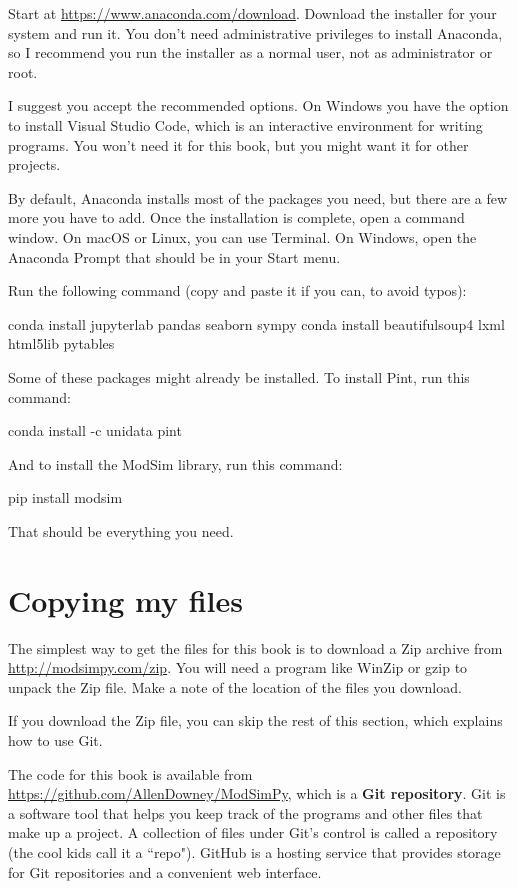 \documentclass[12pt]{book}
\theoremstyle{exercise}
\begin{document}
Start at \url{https://www.anaconda.com/download}.  Download the installer for your system and run it.  You don't need administrative privileges to install Anaconda, so I recommend you run the installer as a normal user, not as administrator or root.

I suggest you accept the recommended options.
On Windows you have the option to install Visual Studio Code, which is an interactive environment for writing programs.  You won't need it for this book, but you might want it for other projects.

By default, Anaconda installs most of the packages you need, but there are a few more you have to add.  Once the installation is complete, open a command window.  On macOS or Linux, you can use Terminal.  On Windows, open the Anaconda Prompt that should be in your Start menu.

Run the following command (copy and paste it if you can, to avoid typos):

\begin{code}
conda install jupyterlab pandas seaborn sympy 
conda install beautifulsoup4 lxml html5lib pytables
\end{code}

Some of these packages might already be installed.  To install Pint, run this command:

\begin{code}
conda install -c unidata pint
\end{code}

And to install the ModSim library, run this command:

\begin{code}
pip install modsim
\end{code}

That should be everything you need.


\section{Copying my files}

The simplest way to get the files for this book is to download a Zip archive from \url{http://modsimpy.com/zip}.  You will need a program like WinZip or gzip to unpack the Zip file.  Make a note of the location of the files you download.

If you download the Zip file, you can skip the rest of this section, which explains how to use Git.

The code for this book is available from
\url{https://github.com/AllenDowney/ModSimPy}, which is a {\bf Git repository}.  Git is a software tool that helps you keep track of the programs and other files that make up a project.  A collection of files under Git's control is called a repository (the cool kids call it a ``repo").  GitHub is a hosting service that provides storage for Git repositories and a convenient web interface.
\end{document}
